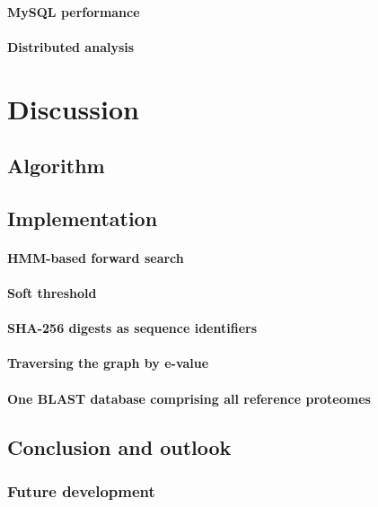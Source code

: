 \documentclass[a4paper,12pt]{scrreprt}
\begin{document}
			\subsubsection{MySQL performance}
				
			\subsubsection{Distributed analysis}
				

\chapter{Discussion}
	
	\section{Algorithm}
		
	\section{Implementation}
		\subsubsection{HMM-based forward search}
			
		\subsubsection{Soft threshold}
		\subsubsection{SHA-256 digests as sequence identifiers}
			
		\subsubsection{Traversing the graph by e-value}
			
		\subsubsection{One BLAST database comprising all reference proteomes}
			
	\section{Conclusion and outlook}
		\subsection{Future development}
			
\end{document}

